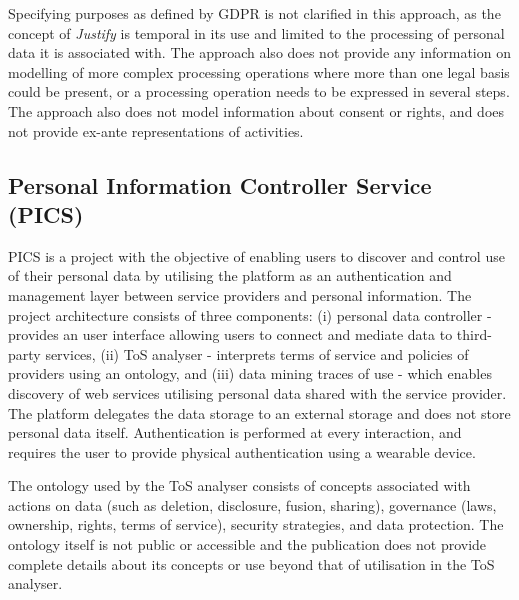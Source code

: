 Specifying purposes as defined by GDPR is not clarified in this approach, as the concept of \textit{Justify} is temporal in its use and limited to the processing of personal data it is associated with. The approach also does not provide any information on modelling of more complex processing operations where more than one legal basis could be present, or a processing operation needs to be expressed in several steps. The approach also does not model information about consent or rights, and does not provide ex-ante representations of activities.

\subsection*{Personal Information Controller Service (PICS)}
PICS is a project with the objective of enabling users to discover and control use of their personal data by utilising the platform as an authentication and management layer between service providers and personal information. The project architecture \cite{winckler_personal_2019} consists of three components: (i) personal data controller - provides an user interface allowing users to connect and mediate data to third-party services, (ii) ToS analyser - interprets terms of service and policies of providers using an ontology, and (iii) data mining traces of use - which enables discovery of web services utilising personal data shared with the service provider. The platform delegates the data storage to an external storage and does not store personal data itself. Authentication is performed at every interaction, and requires the user to provide physical authentication using a wearable device.

The ontology used by the ToS analyser \cite{benfenatki_towards_2018} consists of concepts associated with actions on data (such as deletion, disclosure, fusion, sharing), governance (laws, ownership, rights, terms of service), security strategies, and data protection. The ontology itself is not public or accessible and the publication does not provide complete details about its concepts or use beyond that of utilisation in the ToS analyser.

